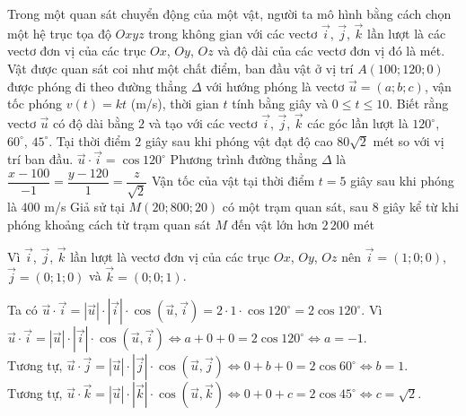 \begin{ex}%
	Trong một quan sát chuyển động của một vật, người ta mô hình bằng cách chọn một hệ trục tọa độ $Oxyz$ trong không gian với các vectơ $\overrightarrow{i}$, $\overrightarrow{j}$, $\overrightarrow{k}$ lần lượt là các vectơ đơn vị của các trục $Ox$, $Oy$, $Oz$ và độ dài của các vectơ đơn vị đó là mét. Vật được quan sát coi như một chất điểm, ban đầu vật ở vị trí $A(100;120;0)$ được phóng đi theo đường thẳng $\Delta$ với hướng phóng là vectơ $\overrightarrow{u}=(a;b;c)$, vận tốc phóng $v(t)=kt$ (m/s), thời gian $t$ tính bằng giây và $0\leq t\leq 10$. Biết rằng vectơ $\overrightarrow{u}$ có độ dài bằng $2$ và tạo với các vectơ $\overrightarrow{i}$, $\overrightarrow{j}$, $\overrightarrow{k}$ các góc lần lượt là $120^\circ$, $60^\circ$, $45^\circ$. Tại thời điểm $2$ giây sau khi phóng vật đạt độ cao $80\sqrt{2}$ mét so với vị trí ban đầu. 
	\choiceTF
	{$\overrightarrow{u} \cdot \overrightarrow{i}= \cos{120^\circ}$}
	{\True Phương trình đường thẳng $\Delta$ là $\dfrac{x-100}{-1}=\dfrac{y-120}{1}=\dfrac{z}{\sqrt{2}}$}
	{\True Vận tốc của vật tại thời điểm $t=5$ giây sau khi phóng là $400$ m/s}
	{\True Giả sử tại $M(20;800;20)$ có một trạm quan sát, sau $8$ giây kể từ khi phóng khoảng cách từ trạm quan sát $M$ đến vật lớn hơn $2\,200$ mét}
	\loigiai
	{Vì $\overrightarrow{i}$, $\overrightarrow{j}$, $\overrightarrow{k}$ lần lượt là vectơ đơn vị của các trục $Ox$, $Oy$, $Oz$ nên $\overrightarrow{i}=(1;0;0)$, $\overrightarrow{j}=(0;1;0)$ và $\overrightarrow{k}=(0;0;1)$.
		\begin{itemchoice}
			\itemch Ta có $\overrightarrow{u} \cdot \overrightarrow{i} = \left|\overrightarrow{u}\right| \cdot \left|\overrightarrow{i}\right| \cdot \cos\left(\overrightarrow{u}, \overrightarrow{i}\right) = 2 \cdot 1 \cdot \cos{120^\circ} = 2\cos{120^\circ}$.
			\itemch Vì $\overrightarrow{u} \cdot \overrightarrow{i} = \left|\overrightarrow{u}\right| \cdot \left|\overrightarrow{i}\right| \cdot \cos\left(\overrightarrow{u}, \overrightarrow{i}\right) \Leftrightarrow a+0+0=2\cos{120^\circ} \Leftrightarrow a=-1$.\\
			Tương tự, $\overrightarrow{u} \cdot \overrightarrow{j} = \left|\overrightarrow{u}\right| \cdot \left|\overrightarrow{j}\right| \cdot \cos\left(\overrightarrow{u}, \overrightarrow{j}\right) \Leftrightarrow 0+b+0=2\cos{60^\circ} \Leftrightarrow b=1$.\\
			Tương tự, $\overrightarrow{u} \cdot \overrightarrow{k} = \left|\overrightarrow{u}\right| \cdot \left|\overrightarrow{k}\right| \cdot \cos\left(\overrightarrow{u}, \overrightarrow{k}\right) \Leftrightarrow 0+0+c=2\cos{45^\circ} \Leftrightarrow c=\sqrt{2}$.\\

\end{itemchoice}}
\end{ex}
